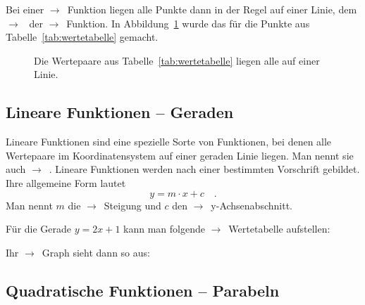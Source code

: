 \documentclass{arbeitsblatt}
\newcommand*\siehe{$\rightarrow$~}
\newcommand*\begriff{\siehe\ac}
\newcounter{beispiel}
\begin{document}
Bei einer \begriff{Funktion} liegen alle Punkte dann in der Regel auf einer
Linie, dem \siehe{} der \begriff{Funktion}.  In
Abbildung~\ref{fig:wertepaare-linie} wurde das für die Punkte aus
Tabelle~\ref{tab:wertetabelle} gemacht.

\begin{figure}
  \centering
  \caption{Die Wertepaare aus Tabelle~\ref{tab:wertetabelle} liegen alle auf
    einer Linie.}
  \label{fig:wertepaare-linie}
\end{figure}

\subsection{Lineare Funktionen -- Geraden}

Lineare Funktionen sind eine spezielle Sorte von Funktionen, bei denen alle
Wertepaare im Koordinatensystem auf einer geraden Linie liegen.  Man nennt sie
auch \siehe{}.  Lineare Funktionen werden nach einer bestimmten
Vorschrift gebildet.  Ihre allgemeine Form lautet
\begin{equation}
  \label{eq:lineare-funktion}
  y = m\cdot x + c \quad.
\end{equation}
Man nennt $m$ die \begriff{Steigung} und $c$ den \begriff{y-Achsenabschnitt}.

\begin{beispiel}
  Für die Gerade $y=2x+1$ kann man folgende \begriff{Wertetabelle} aufstellen:
  \begin{center}
  \end{center}
  Ihr \begriff{Graph} sieht dann so aus:
  \begin{center}
  \end{center}
\end{beispiel}


\subsection{Quadratische Funktionen -- Parabeln}

\printacronyms
\end{document}
